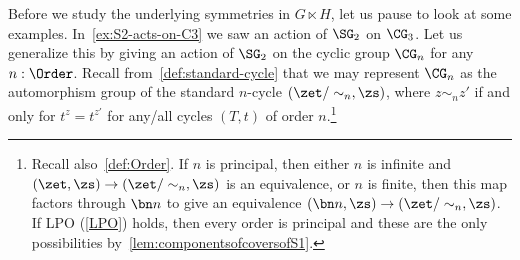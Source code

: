 Before we study the underlying symmetries in $G \ltimes H$,
let us pause to look at some examples.
In~\cref{ex:S2-acts-on-C3} we saw an action of $\SG_2$ on $\CG_3$.
Let us generalize this by giving an action of $\SG_2$ on the cyclic group
$\CG_n$ for any $n : \Order$.
Recall from~\cref{def:standard-cycle}
that we may represent $\CG_n$ as the automorphism group
of the standard $n$-cycle $(\zet/\sim_n, \zs)$,
where $z \sim_n z'$ if and only for $t^z = t^{z'}$ for any/all cycles $(T,t)$
of order $n$.\footnote{%
  Recall also~\cref{def:Order}.
  If $n$ is principal, then either $n$ is infinite
  and $(\zet, \zs) \to (\zet/\sim_n, \zs)$ is an equivalence,
  or $n$ is finite, then this map factors through $\bn n$
  to give an equivalence $(\bn n,\zs) \to (\zet/\sim_n, \zs)$.
  If LPO (\cref{LPO}) holds, then every order is principal and
  these are the only possibilities by~\cref{lem:componentsofcoversofS1}.}

